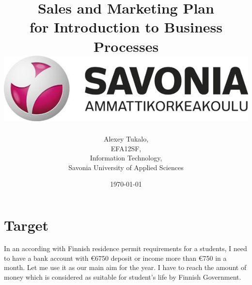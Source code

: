\documentclass[english]{article}
\date{}
\begin{document}
\title{\vspace{2in}Sales and Marketing Plan\\
\small for Introduction to Business Processes\\
\vspace{0.5in}\includegraphics{savonia.jpg}}

\nopagebreak
\maketitle


\vspace{3in}

\author{
\begin{flushright}
Alexey Tukalo,\\
EFA12SF,\\
Information Technology,\\
Savonia University of Applied Sciences
\end{flushright}
}

\date{\today}
\thispagestyle{empty}

\newpage
\setcounter{page}{1}
\setcounter{tocdepth}{2}


\section{Target}

In an according with Finnish residence permit requirements for a students, I need to have a bank account with  \euro 6750  deposit or income more than \euro 750 in a month. Let me use it as our main aim for the year. I have to reach the amount of money which is considered as suitable for student's life by Finnish Government.\\
\end{document}
